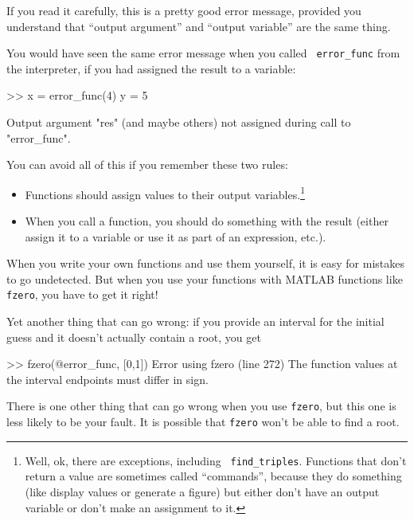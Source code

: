 \documentclass[
]{book}
\numberwithin{Answer}{chapter}
\numberwithin{Exercise}{chapter}
\begin{document}
If you read it carefully, this is a pretty good error message,
provided you understand that ``output argument'' and ``output variable'' are the same thing.


You would have seen the same error message when you called {\tt
error\_func} from the interpreter, if you had assigned the result
to a variable:

\begin{code}
>> x = error_func(4)
y = 5

Output argument "res" (and maybe others) not assigned during
call to "error_func".
\end{code}

You can avoid all of this if you remember these two rules:

\begin{itemize}

\item Functions should assign values to their output
variables.\footnote{Well, ok, there are exceptions, including {\tt
find\_triples}. Functions that don't return a value are sometimes
called ``commands'', because they do something (like display
values or generate a figure) but either don't have an output
variable or don't make an assignment to it.}

\item When you call a function, you should do something with
the result (either assign it to a variable or use it as part of an
expression, etc.).

\end{itemize}

When you write your own functions and use them yourself, it is easy
for mistakes to go undetected.  But when you use your functions with
MATLAB functions like {\tt fzero}, you have to get it right!

Yet another thing that can go wrong: if you provide an interval for the
initial guess and it doesn't actually contain a root, you get

\begin{code}
>> fzero(@error_func, [0,1])
Error using fzero (line 272)
The function values at the interval endpoints must differ in sign.
\end{code}


There is one other thing that can go wrong when you use {\tt fzero}, but
this one is less likely to be your fault.  It is possible that {\tt fzero}
won't be able to find a root.
\end{document}
